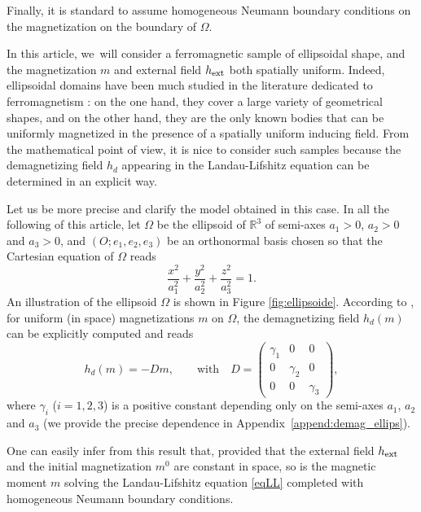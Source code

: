 \documentclass[10pt]{amsart}
\theoremstyle{definition}
\newcommand{\R} {\mathbb{R}}
\begin{document}
Finally, it is standard to assume homogeneous Neumann boundary conditions on the magnetization on the boundary of $\Omega$.

In this article, we~will consider a ferromagnetic sample of ellipsoidal shape, and the magnetization $m$ and external field $h_{\rm ext}$ both spatially uniform. Indeed, ellipsoidal domains have been much studied in the literature dedicated to ferromagnetism \hbox{\cite{osborn1945demagnetizing,di2016newtonian,takahashi2017ellipsoids}}: on the one hand, they cover a large variety of geometrical shapes, and on the other hand, they are the only known bodies that can be uniformly magnetized in the presence of a spatially uniform inducing field. From the mathematical point of view, it is nice to consider such samples because the demagnetizing field $h_d$ appearing in the Landau-Lifshitz equation can be determined in an explicit way.

Let us be more precise and clarify the model obtained in this case. In all the following of this article, let $\Omega$ be the ellipsoid of $\R^3$ of semi-axes $a_1>0$, $a_2>0$ and $a_3>0$, and $(O;e_1,e_2,e_3)$ be an orthonormal basis chosen so that the Cartesian equation of $\Omega$ reads
\begin{equation}\label{eq_ellips}
\frac{x^2}{a_1^2}+\frac{y^2}{a_2^2}+\frac{z^2}{a_3^2}=1.
\end{equation}
An illustration of the ellipsoid $\Omega$ is shown in Figure \ref{fig:ellipsoide}.
According to \cite{osborn1945demagnetizing,di2016newtonian}, for uniform (in space) magnetizations $m$ on $\Omega$, the demagnetizing field $h_d(m)$ can be explicitly computed and reads
\[
h_d(m)=-Dm, \qquad\text{with}\quad D=\begin{pmatrix}
\gamma_1 & 0 & 0\\
0 & \gamma_2 & 0\\
0 & 0 & \gamma_3
\end{pmatrix} ,
\]
where $\gamma_i$ ($i=1,2,3$) is a positive constant depending only on the semi-axes $a_1$, $a_2$ and $a_3$ (we provide the precise dependence in Appendix~\ref{append:demag_ellips}).

One can easily infer from this result that, provided that the external field $h_{\rm ext}$ and the initial magnetization $m^0$ are constant in space, so is the magnetic moment $m$ solving the Landau-Lifshitz equation \eqref{eqLL} completed with homogeneous Neumann boundary conditions.
\end{document}
